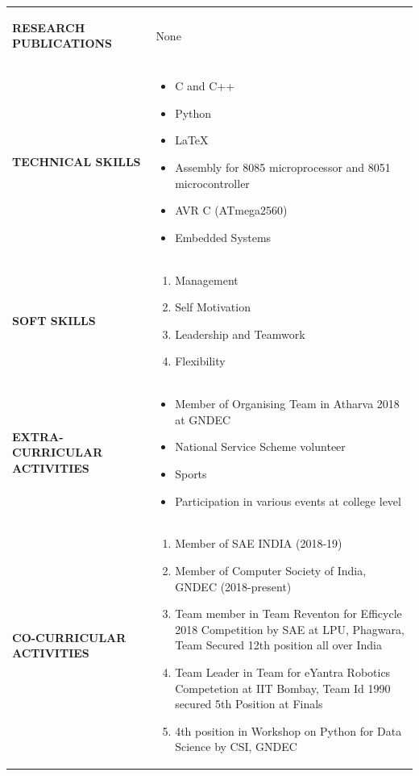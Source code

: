 \documentclass[10pt,doublespace]{article}
\begin{document}
\begin{tabular}{p{3cm}  p{10cm} }
\begin{flushleft} \textbf{RESEARCH PUBLICATIONS}\end{flushleft}&\begin{flushleft} None \end{flushleft}\\
\begin{flushleft} \textbf{TECHNICAL SKILLS}\end{flushleft}&
\begin{itemize}
\item C and C++
\item Python
\item \LaTeX
\item Assembly for 8085 microprocessor and 8051 microcontroller
\item AVR C (ATmega2560)
\item Embedded Systems
\end{itemize}\\
\begin{flushleft} \textbf{SOFT SKILLS}\end{flushleft}&
\begin{enumerate}
\item Management
\item Self Motivation
\item Leadership and Teamwork
\item Flexibility
\end{enumerate}\\
\begin{flushleft} \textbf{EXTRA-CURRICULAR ACTIVITIES}\end{flushleft}&
\begin{itemize}
\item Member of Organising Team in Atharva 2018 at GNDEC
\item National Service Scheme volunteer
\item Sports
\item Participation in various events at college level
\end{itemize}\\
\begin{flushleft} \textbf{CO-CURRICULAR ACTIVITIES}\end{flushleft}&
\begin{enumerate}
\item Member of SAE INDIA (2018-19)
\item Member of Computer Society of India, GNDEC (2018-present)
\item Team member in Team Reventon for Efficycle 2018 Competition by SAE at LPU, Phagwara, Team Secured 12th position all over India 
\item Team Leader in Team for eYantra Robotics Competetion at IIT Bombay, Team Id 1990 secured 5th Position at Finals
\item 4th position in Workshop on Python for Data Science by CSI, GNDEC
\end{enumerate}\\
 \end{tabular}
\end{document}

